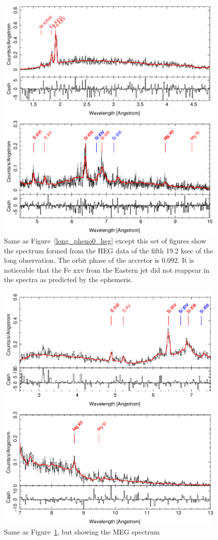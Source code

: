 \begin{figure}[t]
    \centering
        \includegraphics[width = \linewidth]{Chapters/Figures/long_pheno4_heg.png}
        \caption{Same as Figure~\ref{long_pheno0_heg} except this set of figures show the spectrum formed from the HEG data of the fifth 19.2 ksec of the long observation. The orbit phase of the accretor is 0.092. It is noticeable that the Fe {\sc xxv} from the Eastern jet did not reappear in the spectra as predicted by the ephemeris.}
    \label{long_pheno4_heg}
\end{figure}


\begin{figure}[t]
    \centering
        \includegraphics[width = \linewidth]{Chapters/Figures/long_pheno4_meg.png}
        \caption{Same as Figure~\ref{long_pheno4_heg}, but showing the MEG spectrum}
    \label{long_pheno4_meg}
\end{figure}